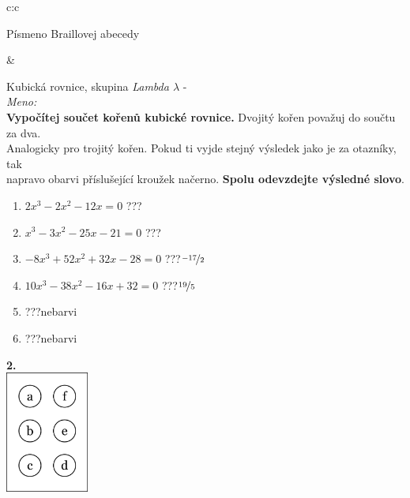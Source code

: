 \documentclass[10pt]{report}
\begin{document}
\begin{tabular}{c:c}
\begin{minipage}[c][99mm][t]{0.49\linewidth}
\begin{center}
\begin{minipage}{0.20\linewidth}
\begin{center}
{\small Písmeno Braillovej abecedy}
\end{center}
\end{minipage}
\end{center}
\end{minipage}
&
\begin{minipage}[c][99mm][t]{0.49\linewidth}
\begin{center}
\vspace{7mm}
{\huge Kubická rovnice, skupina \textit{Lambda $\lambda$} -}\\[4.5mm]
\textit{Meno:}\phantom{xxxxxxxxxxxxxxxxxxxxxxxxxxxxxxxxxxxxxxxxxxxxxxxxxxxxxxxxxxxxxxxxx}\\[3.5mm]
\textbf{Vypočítej součet kořenů kubické rovnice.} Dvojitý kořen považuj do součtu za dva.\\Analogicky pro trojitý kořen. Pokud ti vyjde stejný výsledek jako je za otazníky, tak\\napravo obarvi příslušející kroužek načerno. \textbf{Spolu odevzdejte výsledné slovo}.\\[3mm]
\begin{minipage}{0.77\linewidth}
\begin{center}
\begin{varwidth}{\textwidth}
\begin{enumerate}
\large
\item $2x^3-2x^2-12x=0$\quad \dotfill\; ???\;\dotfill {}
\item $x^3-3x^2-25x-21=0$\quad \dotfill\; ???\;\dotfill {}
\item $-8x^3+52x^2+32x-28=0$\quad \dotfill\; ???\;\dotfill \quad $\nicefrac{-17}{2}$
\item $10x^3-38x^2-16x+32=0$\quad \dotfill\; ???\;\dotfill \quad $\nicefrac{19}{5}$
\item \quad \dotfill\; ???\;\dotfill \quad nebarvi
\item \quad \dotfill\; ???\;\dotfill \quad nebarvi
\end{enumerate}
\end{varwidth}
\end{center}
\end{minipage}
\begin{minipage}{0.20\linewidth}
\begin{center}
{\Huge\bfseries 2.} \\[2mm]
\includegraphics[height=40mm]{../images/braille.png}

\end{center}
\end{minipage}
\end{center}
\end{minipage}
\end{tabular}
\end{document}
